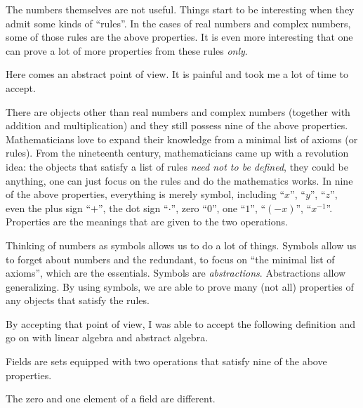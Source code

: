 \begin{note}
    The numbers themselves are not useful. Things start to be interesting when they admit some kinds of ``rules''. In the cases of real numbers and complex numbers, some of those rules are the above properties. It is even more interesting that one can prove a lot of more properties from these rules \textit{only}.

    Here comes an abstract point of view. It is painful and took me a lot of time to accept.

    There are objects other than real numbers and complex numbers (together with addition and multiplication) and they still possess nine of the above properties. Mathematicians love to expand their knowledge from a minimal list of axioms (or rules). From the nineteenth century, mathematicians came up with a revolution idea: the objects that satisfy a list of rules \textit{need not to be defined}, they could be anything, one can just focus on the rules and do the mathematics works. In nine of the above properties, everything is merely symbol, including ``$x$'', ``$y$'', ``$z$'', even the plus sign ``$+$'', the dot sign ``$\cdot$'', zero ``$0$'', one ``$1$'', ``$(-x)$'', ``$x^{-1}$''. Properties are the meanings that are given to the two operations.

    Thinking of numbers as symbols allows us to do a lot of things. Symbols allow us to forget about numbers and the redundant, to focus on ``the minimal list of axioms'', which are the essentials. Symbols are \textit{abstractions}. Abstractions allow generalizing. By using symbols, we are able to prove many (not all) properties of any objects that satisfy the rules.

    By accepting that point of view, I was able to accept the following definition and go on with linear algebra and abstract algebra.
\end{note}

\begin{definition}
    Fields are sets equipped with two operations that satisfy nine of the above properties.
\end{definition}

\begin{note}
    The zero and one element of a field are different.
\end{note}

